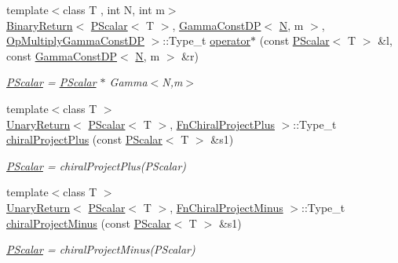 \begin{DoxyCompactItemize}
{\footnotesize template$<$class T , int N, int m$>$ }\\\mbox{\hyperlink{structENSEM_1_1BinaryReturn}{Binary\+Return}}$<$ \mbox{\hyperlink{classENSEM_1_1PScalar}{P\+Scalar}}$<$ T $>$, \mbox{\hyperlink{classENSEM_1_1GammaConstDP}{Gamma\+Const\+DP}}$<$ \mbox{\hyperlink{operator__name__util_8cc_a7722c8ecbb62d99aee7ce68b1752f337}{N}}, m $>$, \mbox{\hyperlink{structENSEM_1_1OpMultiplyGammaConstDP}{Op\+Multiply\+Gamma\+Const\+DP}} $>$\+::Type\+\_\+t \mbox{\hyperlink{group__primscalar_ga97e70139990daa175326a04636431dbd}{operator$\ast$}} (const \mbox{\hyperlink{classENSEM_1_1PScalar}{P\+Scalar}}$<$ T $>$ \&l, const \mbox{\hyperlink{classENSEM_1_1GammaConstDP}{Gamma\+Const\+DP}}$<$ \mbox{\hyperlink{operator__name__util_8cc_a7722c8ecbb62d99aee7ce68b1752f337}{N}}, m $>$ \&r)
\begin{DoxyCompactList}\small\item\em \mbox{\hyperlink{classENSEM_1_1PScalar}{P\+Scalar}} = \mbox{\hyperlink{classENSEM_1_1PScalar}{P\+Scalar}} $\ast$ Gamma$<$\+N,m$>$ \end{DoxyCompactList}\item 
{\footnotesize template$<$class T $>$ }\\\mbox{\hyperlink{structENSEM_1_1UnaryReturn}{Unary\+Return}}$<$ \mbox{\hyperlink{classENSEM_1_1PScalar}{P\+Scalar}}$<$ T $>$, \mbox{\hyperlink{structENSEM_1_1FnChiralProjectPlus}{Fn\+Chiral\+Project\+Plus}} $>$\+::Type\+\_\+t \mbox{\hyperlink{group__primscalar_ga5c2866755d31c5ec528c5763aa16a833}{chiral\+Project\+Plus}} (const \mbox{\hyperlink{classENSEM_1_1PScalar}{P\+Scalar}}$<$ T $>$ \&s1)
\begin{DoxyCompactList}\small\item\em \mbox{\hyperlink{classENSEM_1_1PScalar}{P\+Scalar}} = chiral\+Project\+Plus(\+P\+Scalar) \end{DoxyCompactList}\item 
{\footnotesize template$<$class T $>$ }\\\mbox{\hyperlink{structENSEM_1_1UnaryReturn}{Unary\+Return}}$<$ \mbox{\hyperlink{classENSEM_1_1PScalar}{P\+Scalar}}$<$ T $>$, \mbox{\hyperlink{structENSEM_1_1FnChiralProjectMinus}{Fn\+Chiral\+Project\+Minus}} $>$\+::Type\+\_\+t \mbox{\hyperlink{group__primscalar_ga145e49e169b22a3ded82ba8af1b15da2}{chiral\+Project\+Minus}} (const \mbox{\hyperlink{classENSEM_1_1PScalar}{P\+Scalar}}$<$ T $>$ \&s1)
\begin{DoxyCompactList}\small\item\em \mbox{\hyperlink{classENSEM_1_1PScalar}{P\+Scalar}} = chiral\+Project\+Minus(\+P\+Scalar) \end{DoxyCompactList}\item 

\end{DoxyCompactItemize}
